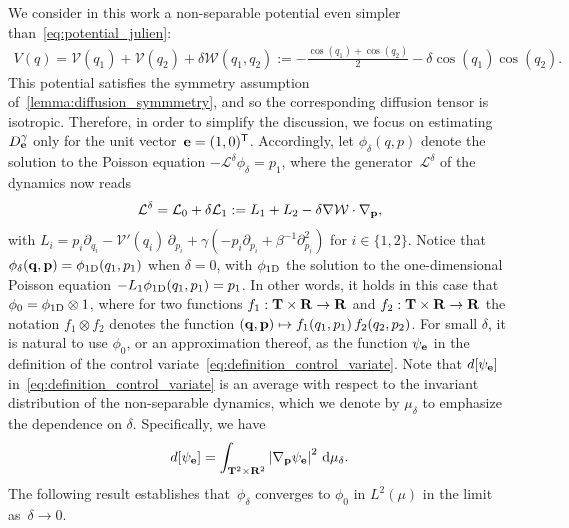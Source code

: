 \documentclass[11pt,a4paper]{article}
\begin{document}
We consider in this work a non-separable potential even simpler than~\eqref{eq:potential_julien}:
\begin{align}
    \label{eq:potential_simple}
    V(q) =  \mathcal V(q_1) + \mathcal V(q_2) + \delta \mathcal W(q_1, q_2) := - \frac{\cos(q_1) + \cos(q_2)}{2} - \delta \cos(q_1) \cos(q_2).
\end{align}
This potential satisfies the symmetry assumption of~\cref{lemma:diffusion_symmmetry},
and so the corresponding diffusion tensor is isotropic.
Therefore, in order to simplify the discussion,
we focus on estimating~$D^{\gamma}_{\boldsymbol{\mathbf e}}$ only for the unit vector~$\boldsymbol{\mathbf e} = (1, 0)^\mathsf T$.
Accordingly, let $\phi_\delta(q, p)$ denote the solution to the Poisson equation $- \mathcal L^{\delta} \phi_\delta = p_1$,
where the generator~$\mathcal L^{\delta}$ of the dynamics now reads
\begin{align}
    \label{eq:generator}
    \mathcal L^{\delta} = \mathcal L_0 + \delta \mathcal L_1
    := L_1 + L_2
    - \delta \nabla \mathcal W \cdot \nabla_{\boldsymbol{\mathbf p}},
\end{align}
with $L_i = p_i \partial_{q_i} - \mathcal V'(q_i) \, \partial_{p_i} + \gamma \left(- p_i \partial_{p_i} + \beta^{-1} \partial^2_{p_i} \right)$
for $i \in \{1, 2\}$.
Notice that $\phi_\delta(\boldsymbol{\mathbf q}, \boldsymbol{\mathbf p}) = \phi_{\rm 1D}(q_1, p_1)$ when $\delta = 0$,
with $\phi_{\rm 1D}$ the solution to the one-dimensional Poisson equation $-L_1 \phi_{\rm 1D}(q_1, p_1) = p_1$.
In other words, it holds in this case that $\phi_0 = \phi_{\rm 1D} \otimes 1$,
where for two functions $f_1: \mathbf T \times \mathbf R \rightarrow \mathbf R$ and $f_2: \mathbf T \times \mathbf R \rightarrow \mathbf R$
the notation $f_1 \otimes f_2$ denotes the function $(\boldsymbol{\mathbf q}, \boldsymbol{\mathbf p}) \mapsto f_1(q_1,p_1) \, f_2(q_2,p_2)$.
For small $\delta$, it is natural to use $\phi_0$, or an approximation thereof,
as the function $\psi_{\boldsymbol{\mathbf e}}$ in the definition of the control variate~\eqref{eq:definition_control_variate}.
Note that $d[\psi_{\boldsymbol{\mathbf e}}]$ in~\eqref{eq:definition_control_variate} is an average with respect to the invariant distribution of the non-separable dynamics,
which we denote by $\mu_{\delta}$ to emphasize the dependence on $\delta$.
Specifically, we have
\begin{equation}
    \label{eq:effective_diffusion_d}
    d[\psi_{\vect e}]
    = \int_{\torus^2 \times \real^2} \abs{\grad_{\vect p} \psi_{\vect e}}^2 \, \d \mu_{\delta}.
\end{equation}
The following result establishes that~$\phi_\delta$ converges to $\phi_0$ in $L^2(\mu)$ in the limit as~$\delta \to 0$.
\end{document}
